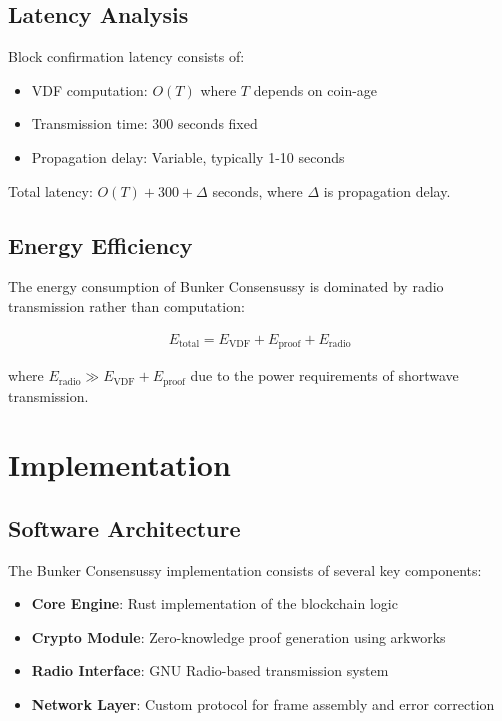 \documentclass[11pt,a4paper]{article}
\begin{document}
\subsection{Latency Analysis}

Block confirmation latency consists of:
\begin{itemize}
\item VDF computation: $O(T)$ where $T$ depends on coin-age
\item Transmission time: 300 seconds fixed
\item Propagation delay: Variable, typically 1-10 seconds
\end{itemize}

Total latency: $O(T) + 300 + \Delta$ seconds, where $\Delta$ is propagation delay.

\subsection{Energy Efficiency}

The energy consumption of Bunker Consensussy is dominated by radio transmission rather than computation:

\begin{align}
E_{\text{total}} = E_{\text{VDF}} + E_{\text{proof}} + E_{\text{radio}}
\end{align}

where $E_{\text{radio}} \gg E_{\text{VDF}} + E_{\text{proof}}$ due to the power requirements of shortwave transmission.

\section{Implementation}

\subsection{Software Architecture}

The Bunker Consensussy implementation consists of several key components:

\begin{itemize}
\item \textbf{Core Engine}: Rust implementation of the blockchain logic
\item \textbf{Crypto Module}: Zero-knowledge proof generation using arkworks
\item \textbf{Radio Interface}: GNU Radio-based transmission system
\item \textbf{Network Layer}: Custom protocol for frame assembly and error correction
\end{itemize}
\end{document}
